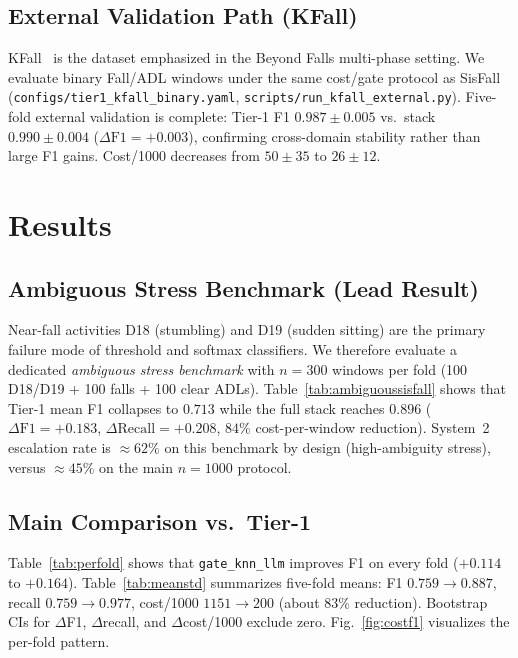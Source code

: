 \documentclass[journal]{IEEEtran}
\begin{document}
\subsection{External Validation Path (KFall)}
KFall~\cite{kfall2021} is the dataset emphasized in the Beyond Falls multi-phase setting. We evaluate binary Fall/ADL windows under the same cost/gate protocol as SisFall (\texttt{configs/tier1\_kfall\_binary.yaml}, \texttt{scripts/run\_kfall\_external.py}). Five-fold external validation is complete: Tier-1 F1 $0.987{\pm}0.005$ vs.\ stack $0.990{\pm}0.004$ ($\Delta\text{F1}{=}+0.003$), confirming cross-domain stability rather than large F1 gains. Cost/1000 decreases from $50{\pm}35$ to $26{\pm}12$.

\section{Results}
\label{sec:results}



\subsection{Ambiguous Stress Benchmark (Lead Result)}
\label{sec:ambiguous}
Near-fall activities D18 (stumbling) and D19 (sudden sitting) are the primary failure mode of threshold and softmax classifiers. We therefore evaluate a dedicated \emph{ambiguous stress benchmark} with $n{=}300$ windows per fold (100 D18/D19 + 100 falls + 100 clear ADLs). Table~\ref{tab:ambiguoussisfall} shows that Tier-1 mean F1 collapses to $0.713$ while the full stack reaches $0.896$ ($\Delta\text{F1}{=}+0.183$, $\Delta\text{Recall}{=}+0.208$, $84\%$ cost-per-window reduction). System~2 escalation rate is $\approx 62\%$ on this benchmark by design (high-ambiguity stress), versus $\approx 45\%$ on the main $n{=}1000$ protocol.



\subsection{Main Comparison vs.\ Tier-1}
Table~\ref{tab:perfold} shows that \texttt{gate\_knn\_llm} improves F1 on every fold ($+0.114$ to $+0.164$). Table~\ref{tab:meanstd} summarizes five-fold means: F1 $0.759{\rightarrow}0.887$, recall $0.759{\rightarrow}0.977$, cost/1000 $1151{\rightarrow}200$ (about $83\%$ reduction). Bootstrap CIs for $\Delta$F1, $\Delta$recall, and $\Delta$cost/1000 exclude zero. Fig.~\ref{fig:costf1} visualizes the per-fold pattern.
\end{document}
